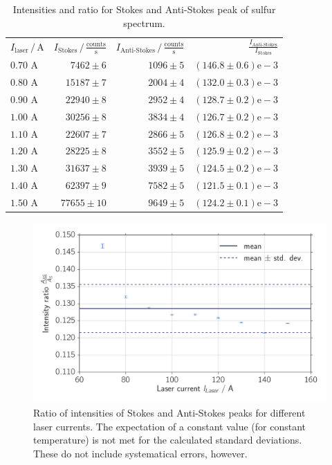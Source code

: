 \begin{table}[htpb]
    \centering
    \caption{
        Intensities and ratio for Stokes and Anti-Stokes peak of sulfur spectrum.
        }
    \label{tab:sulfur_intensity}
    \begin{tabular}{l r r r}
        \rowcolor{LightCyan}$I_\text{laser} \, / \, \text{A}$ & 
        $I_\text{Stokes} \, / \, \frac{\text{counts}}{\text{s}}$ &
        $I_\text{Anti-Stokes} \, / \, \frac{\text{counts}}{\text{s}}$ &
        $\frac{I_\text{Anti-Stokes}}{I_\text{Stokes}}$ \\
        \cellcolor{LightCyan}$0.70$ A & $7462 \pm 6$ & $1096 \pm 5$ & $(146.8 \pm 0.6)\mathrm{e}-3$   \\
        \cellcolor{LightCyan}$0.80$ A & $15187 \pm 7$ & $2004 \pm 4$ & $(132.0 \pm 0.3)\mathrm{e}-3$   \\
        \cellcolor{LightCyan}$0.90$ A & $22940 \pm 8$ & $2952 \pm 4$ & $(128.7 \pm 0.2)\mathrm{e}-3$   \\
        \cellcolor{LightCyan}$1.00$ A & $30256 \pm 8$ & $3834 \pm 4$ & $(126.7 \pm 0.2)\mathrm{e}-3$   \\
        \cellcolor{LightCyan}$1.10$ A & $22607 \pm 7$ & $2866 \pm 5$ & $(126.8 \pm 0.2)\mathrm{e}-3$   \\
        \cellcolor{LightCyan}$1.20$ A & $28225 \pm 8$ & $3552 \pm 5$ & $(125.9 \pm 0.2)\mathrm{e}-3$   \\
        \cellcolor{LightCyan}$1.30$ A & $31637 \pm 8$ & $3939 \pm 5$ & $(124.5 \pm 0.2)\mathrm{e}-3$   \\
        \cellcolor{LightCyan}$1.40$ A & $62397 \pm 9$ & $7582 \pm 5$ & $(121.5 \pm 0.1)\mathrm{e}-3$   \\
        \cellcolor{LightCyan}$1.50$ A & $77655 \pm 10$ & $9649 \pm 5$ & $(124.2 \pm 0.1)\mathrm{e}-3$   
    \end{tabular}
\end{table}

\begin{figure}[htpb]
    \centering
    \includegraphics[width=0.8\linewidth]{analysis/figures/ccd_temp_rate}
    \caption{
        Ratio of intensities of Stokes and Anti-Stokes peaks for different laser currents. 
        The expectation of a constant value (for constant temperature) is not met for the 
        calculated standard deviations. These do not include systematical errors, however. 
        }
    \label{fig:ccd_temp_rate}
\end{figure}

